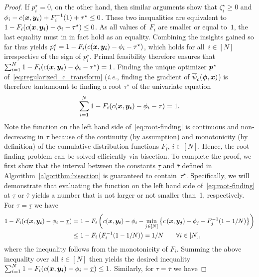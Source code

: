 \documentclass[11pt, a4paper, oneside, reqno]{article}
\begin{document}
\begin{proof}
		If $p_i^\star = 0$, on the other hand, then similar arguments show that $\zeta_i^\star \geq 0$ and $\phi_i-c(\boldsymbol {x},\boldsymbol {y_i}) + F_i^{-1}(1) + \tau^\star \leq 0$. These two inequalities are equivalent to $1 - F_i(c(\boldsymbol {x},\boldsymbol {y_i})-\phi_i -\tau^\star) \leq 0$. As all values of~$F_i$ are smaller or equal to~$1$, the last equality must in in fact hold as an equality. Combining the insights gained so far thus yields $p_i^\star = 1 - F_i(c(\boldsymbol {x},\boldsymbol {y_i})-\phi_i -\tau^\star)$, which holds for all~$i\in[N]$ irrespective of the sign of $p_i^\star$. Primal feasibility therefore ensures that $\sum_{i=1}^N 1 - F_i(c(\boldsymbol {x},\boldsymbol {y_i})-\phi_i -\tau^\star) = 1$. Finding the unique optimizer $\boldsymbol p^\star$ of~\eqref{eq:regularized_c_transform} ({\em i.e.}, finding the gradient of $ \overline \psi_c(\boldsymbol \phi, \boldsymbol x)$) is therefore tantamount to finding a root $\tau^\star$ of the univariate equation 
		\begin{align}
		    \label{eq:root-finding}
		    \sum_{i=1}^N 1 - F_i(c(\boldsymbol {x},\boldsymbol {y_i})-\phi_i -\tau) = 1.
		\end{align}
		Note the function on the left hand side of~\eqref{eq:root-finding} is continuous and non-decreasing in $\tau$ because of the continuity (by assumption) and monotonicity (by definition) of the cumulative distribution functions $F_i$, $i\in[N]$.
		Hence, the root finding problem can be solved efficiently via bisection.
		To complete the proof, we first show that the interval between the constants $\underline{\tau}$ and $\overline{\tau}$ defined in Algorithm~\ref{algorithm:bisection} is guaranteed to contain~$\tau^\star$. Specifically, we will demonstrate that evaluating the function on the left hand side of~\eqref{eq:root-finding} at $\underline\tau$ or $\overline \tau$ yields a number that is not larger or not smaller than~1, respectively. %
		For $\tau=\underline\tau$ we have
		\begin{align*}
		    1 - F_i(c(\boldsymbol {x},\boldsymbol {y_i})-\phi_i -\underline\tau) &= 1 - F_i \left( c(\boldsymbol {x},\boldsymbol {y_i})-\phi_i - \min_{j \in [N]} \left\{ c \left( \boldsymbol {x}, \boldsymbol {y_j} \right) - \phi_j -F_j^{-1}(1-1/N) \right\} \right) \\
		    &\leq 1 - F_i \left( F_i^{-1}(1-1/N) \right) = 1 / N\qquad \forall i\in[N],
		\end{align*}
		where the inequality follows from the monotonicity of $F_i$. Summing the above inequality over all $i\in[N]$ then yields the desired inequality $\sum_{i =1}^N 1 - F_i(c(\boldsymbol {x},\boldsymbol {y_i})-\phi_i -\underline\tau) \leq 1$. Similarly, for $\tau=\overline\tau$ we have

\end{proof}
\end{document}
